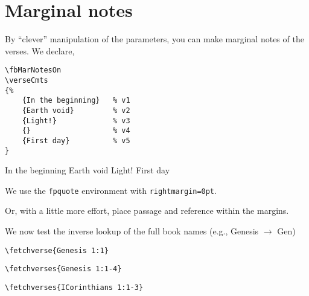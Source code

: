 \documentclass{article}
\begin{document}

\def\mpfmt#1{\afterRef{{}}\marginpar{\small\raggedright#1}}

\medskip\noindent
\fetchverses*[showfirst,priorref=\mpfmt,delims,from*=ASV]{Gen 1:1-5}

\section{Marginal  notes}

By ``clever'' manipulation of the parameters, you can make
marginal notes of the verses. We declare,
\begin{Verbatim}[xleftmargin=\leftmargini,fontsize=\small]
\fbMarNotesOn
\verseCmts
{%
    {In the beginning}   % v1
    {Earth void}         % v2
    {Light!}             % v3
    {}                   % v4
    {First day}          % v5
}
\end{Verbatim}
\fbMarNotesOn
\verseCmts
{%
    {In the beginning}   %
    {Earth void}         %
    {Light!}             %
    {}                   %
    {First day}          %
}
\afterRef{\par\kern3pt}

\noindent
We use the \texttt{fpquote} environment with \texttt{rightmargin=0pt}.
\begin{fpquote}[rightmargin=0pt]
\end{fpquote}
\afterRef{}\verseCmts{}\fbMarNotesOff

\medskip\noindent Or, with a little more effort, place passage and reference within the margins.
\fbMarNotesOn
{}
\newlength\fbrightmargin \fbrightmargin=80pt
\newlength\vrseNumlength
\settowidth{}
\renewcommand{\fbMarParFmt}[1]{\marginpar{\footnotesize
    \makebox[0pt][r]{\verseFmt{\vrseNum}%
    \parbox[t]{\fbrightmargin}{\raggedright\strut#1\strut}%
    \hspace{\marginparsep}}\hfill}}
\afterRef{\par\kern3pt}
\begin{fpquote}[leftmargin=0pt,rightmargin=\marginparsep+\fbrightmargin+\vrseNumlength]
\end{fpquote}
\fbResetMarParFmt\verseCmts{}\afterRef{}\fbMarNotesOff


\noindent
We now test the inverse lookup of the full book names (e.g., Genesis $\rightarrow$ Gen)

\medskip\noindent\verb~\fetchverse{Genesis 1:1}~\\

\medskip\noindent\verb~\fetchverses{Genesis 1:1-4}~\\

\medskip\noindent\verb~\fetchverses{ICorinthians 1:1-3}~\\
\end{document}
